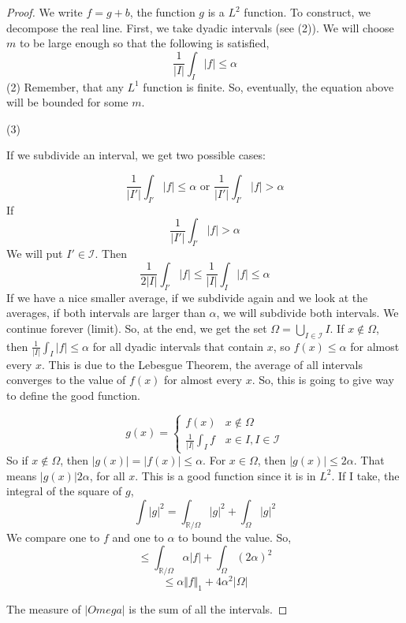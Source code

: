 \documentclass[12pt]{article}
\begin{document}
\begin{proof}
We write $f = g + b$, the function $g$ is a $L^2$ function. To construct, we decompose the real line. First, we take dyadic intervals (see (2)). We will choose $m$ to be large enough so that the following is satisfied,
$$\frac{1}{\vert I \vert} \int_I \vert f \vert \leq \alpha$$
(2)
Remember, that any $L^1$ function is finite. So, eventually, the equation above will be bounded for some $m$. 

(3)

If we subdivide an interval, we get two possible cases:

$$\frac{1}{\vert I' \vert} \int_{I'} \vert f \vert \leq \alpha \text{ or } \frac{1}{\vert I' \vert} \int_{I'} \vert f \vert > \alpha$$
If
$$\frac{1}{\vert I' \vert} \int_{I'} \vert f \vert > \alpha$$
We will put $I' \in \mathcal{I}$. Then 
$$\frac{1}{2\vert I \vert} \int_{I'} \vert f \vert  \leq \frac{1}{\vert I \vert} \int_{I} \vert f \vert \leq \alpha$$ 
If we have a nice smaller average, if we subdivide again and we look at the averages, if both intervals are larger than $\alpha$, we will subdivide both intervals. We continue forever (limit). So, at the end, we get the set $\Omega = \bigcup_{I \in \mathcal{I}} I$. If $x \not \in \Omega$, then $\frac{1}{\vert I \vert} \int_{I} \vert f \vert \leq \alpha$ for all dyadic intervals that contain $x$, so $f(x) \leq \alpha$ for almost every $x$. This is due to the Lebesgue Theorem, the average of all intervals converges to the value of $f(x)$ for almost every $x$. So, this is going to give way to define the good function. 

$$g(x) = \begin{cases} f(x) & x \not \in \Omega \\
\frac{1}{\vert I \vert} \int_I f  & x\in I, I \in \mathcal{I} \end{cases}$$
So if $x \not \in \Omega$, then $\vert g(x)\vert = \vert f(x) \vert \leq \alpha$. For $x \in \Omega$, then $\vert g(x) \vert \leq 2 \alpha$. That means $\vert g(x) \vert 2\alpha$, for all $x$. This is a good function since it is in $L^2$. If I take, the integral of the square of $g$, 
$$\int \vert g \vert^2 = \int_{\mathbb{R}/\Omega} \vert g \vert^2 + \int_\Omega \vert g \vert^2$$
We compare one to $f$ and one to $\alpha$ to bound the value. So,
$$\leq \int_{\mathbb{R}/\Omega} \alpha \vert f \vert  + \int_\Omega (2\alpha)^2$$
$$ \leq \alpha \Vert f \Vert_1 + 4\alpha^2 \vert \Omega \vert$$

\noindent The measure of $\vert Omega \vert$ is the sum of all the intervals. 


\end{proof}
\end{document}
